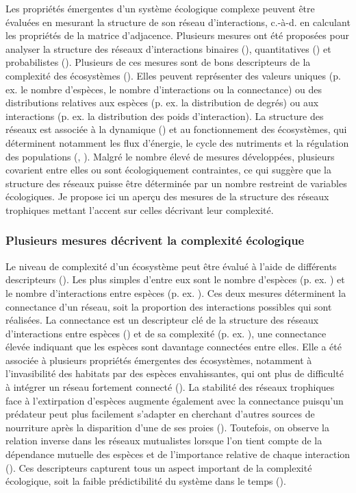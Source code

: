 Les propriétés émergentes d'un système écologique complexe peuvent être évaluées
en mesurant la structure de son réseau d'interactions, c.-à-d. en calculant
les propriétés de la matrice d'adjacence. Plusieurs mesures ont été proposées
pour analyser la structure des réseaux d'interactions binaires
(\cite{Delmas2019Analysing}), quantitatives (\cite{Bersier2002Quantitative}) et
probabilistes (\cite{Poisot2016Structure}). Plusieurs de ces mesures sont de
bons descripteurs de la complexité des écosystèmes (\cite{Landi2018Complexity}).
Elles peuvent représenter des valeurs uniques (p. ex. le nombre d'espèces, le
nombre d'interactions ou la connectance) ou des distributions relatives aux
espèces (p. ex. la distribution de degrés) ou aux interactions (p. ex. la
distribution des poids d'interaction). La structure des réseaux est associée à
la dynamique (\cite{Pascual2006Ecological}) et au fonctionnement des
écosystèmes, qui déterminent notamment les flux d'énergie, le cycle des
nutriments et la régulation des populations (\cite{McCann2011Food},
\cite{Thompson2012Food}). Malgré le nombre élevé de mesures développées,
plusieurs covarient entre elles ou sont écologiquement contraintes, ce qui
suggère que la structure des réseaux puisse être déterminée par un nombre
restreint de variables écologiques. Je propose ici un aperçu des mesures de la
structure des réseaux trophiques mettant l'accent sur celles décrivant leur
complexité. 

\subsubsection{Plusieurs mesures décrivent la complexité écologique} 

Le niveau de complexité d'un écosystème peut être évalué à l'aide de différents
descripteurs (\cite{Landi2018Complexity}). Les plus simples d'entre eux sont le
nombre d'espèces (p. ex. \cite{May1972Will}) et le nombre d'interactions entre
espèces (p. ex. \cite{Okuyama2008Network}). Ces deux mesures déterminent la
connectance d'un réseau, soit la proportion des interactions possibles qui sont
réalisées. La connectance est un descripteur clé de la structure des réseaux
d'interactions entre espèces (\cite{Martinez1992Constant}) et de sa complexité
(p. ex. \cite{Rozdilsky2001Complexity}), une connectance élevée indiquant que
les espèces sont davantage connectées entre elles. Elle a été associée à
plusieurs propriétés émergentes des écosystèmes, notamment à l'invasibilité des
habitats par des espèces envahissantes, qui ont plus de difficulté à intégrer un
réseau fortement connecté (\cite{Smith-Ramesh2017Global}). La stabilité des
réseaux trophiques face à l'extirpation d'espèces augmente également avec la
connectance puisqu'un prédateur peut plus facilement s'adapter en cherchant
d'autres sources de nourriture après la disparition d'une de ses proies
(\cite{Dunne2002Network}). Toutefois, on observe la relation inverse dans les
réseaux mutualistes lorsque l'on tient compte de la dépendance mutuelle des
espèces et de l'importance relative de chaque interaction
(\cite{Vieira2015Simple}). Ces descripteurs capturent tous un aspect important
de la complexité écologique, soit la faible prédictibilité du système dans le
temps (\cite{Strydom2021Svd}). 

